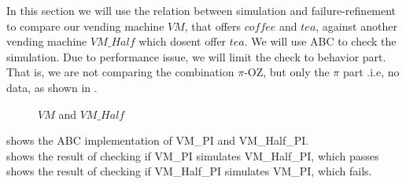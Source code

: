 In this section we will use the relation between simulation and failure-refinement  to compare our vending machine $VM$, that offers $coffee$ and $tea$, against another vending machine $VM\_Half$ which dosent offer $tea$. We will use ABC to check the simulation. Due to performance issue, we will limit the check to behavior part. That is, we are not comparing the combination $\pi$-OZ, but only the $\pi$ part   .i.e, no data, as shown in .
\begin{figure}[H]%
\centering
{}%
\qquad
{}%
\caption{$VM$ and $VM\_Half$}
\label{vm_and_vmHalf}
\end{figure}

 shows the ABC implementation of VM\_PI and VM\_Half\_PI.\\
 shows the result of checking if VM\_PI simulates VM\_Half\_PI, which passes\\
 shows the result of checking if VM\_Half\_PI simulates  VM\_PI, which fails.









